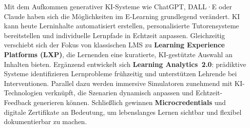 Mit dem Aufkommen generativer KI-Systeme wie ChatGPT, DALL·E oder Claude haben sich die Möglichkeiten im E-Learning grundlegend verändert. KI kann heute Lerninhalte automatisiert erstellen, personalisierte Tutorensysteme bereitstellen und individuelle Lernpfade in Echtzeit anpassen.\parencite[S.~43]{zhai_chatgpt_2023} Gleichzeitig verschiebt sich der Fokus von klassischen LMS zu \textbf{Learning Experience Platforms (LXP)}, die Lernenden eine kuratierte, KI-gestützte Auswahl an Inhalten bieten.\parencite[S.~1]{cockrill_learning_2021} Ergänzend entwickelt sich \textbf{Learning Analytics~2.0}: prädiktive Systeme identifizieren Lernprobleme frühzeitig und unterstützen Lehrende bei Interventionen.\parencite[S.~1979f]{ifenthaler_utilising_2020} Parallel dazu werden immersive Simulatoren zunehmend mit KI-Technologien verknüpft, die Szenarien dynamisch anpassen und Echtzeit-Feedback generieren können. Schließlich gewinnen \textbf{Microcredentials} und digitale Zertifikate an Bedeutung, um lebenslanges Lernen sichtbar und flexibel dokumentierbar zu machen.\parencite[S.~1]{gish-lieberman_micro-credentials_2021}

